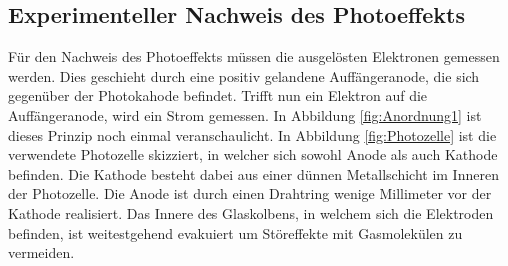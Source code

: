 \subsection{Experimenteller Nachweis des Photoeffekts}
\label{sec:nachweis}
Für den Nachweis des Photoeffekts müssen die ausgelösten Elektronen gemessen werden. Dies geschieht durch eine positiv gelandene 
Auffängeranode, die sich gegenüber der Photokahode befindet. Trifft nun ein Elektron auf die Auffängeranode, wird ein Strom
gemessen. In Abbildung \ref{fig:Anordnung1} ist dieses Prinzip noch einmal veranschaulicht. In Abbildung \ref{fig:Photozelle} ist 
die verwendete Photozelle skizziert, in welcher sich sowohl Anode als auch Kathode befinden. Die Kathode besteht dabei aus einer dünnen
Metallschicht im Inneren der Photozelle. Die Anode ist durch einen Drahtring wenige Millimeter vor der Kathode realisiert. Das Innere des
Glaskolbens, in welchem sich die Elektroden befinden, ist weitestgehend evakuiert um Störeffekte mit Gasmolekülen zu vermeiden. 


